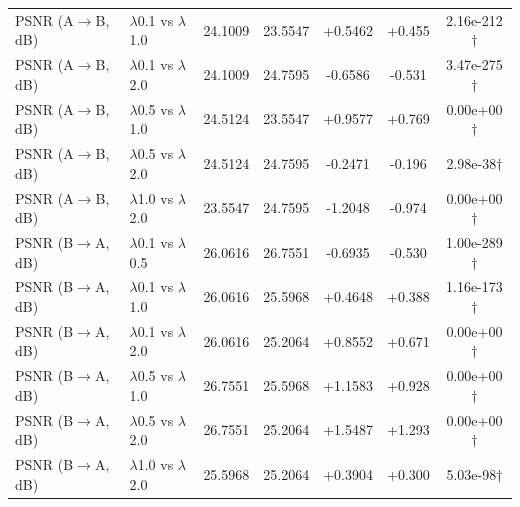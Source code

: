 \begin{table}[t]
\begin{tabular}{l l c c c c c}
PSNR (A$\to$B, dB) & $\lambda$0.1 vs $\lambda$1.0 & 24.1009 & 23.5547 & +0.5462 & +0.455 & 2.16e-212$\dagger$ \\
PSNR (A$\to$B, dB) & $\lambda$0.1 vs $\lambda$2.0 & 24.1009 & 24.7595 & -0.6586 & -0.531 & 3.47e-275$\dagger$ \\
PSNR (A$\to$B, dB) & $\lambda$0.5 vs $\lambda$1.0 & 24.5124 & 23.5547 & +0.9577 & +0.769 & 0.00e+00$\dagger$ \\
PSNR (A$\to$B, dB) & $\lambda$0.5 vs $\lambda$2.0 & 24.5124 & 24.7595 & -0.2471 & -0.196 & 2.98e-38$\dagger$ \\
PSNR (A$\to$B, dB) & $\lambda$1.0 vs $\lambda$2.0 & 23.5547 & 24.7595 & -1.2048 & -0.974 & 0.00e+00$\dagger$ \\
\midrule
PSNR (B$\to$A, dB) & $\lambda$0.1 vs $\lambda$0.5 & 26.0616 & 26.7551 & -0.6935 & -0.530 & 1.00e-289$\dagger$ \\
PSNR (B$\to$A, dB) & $\lambda$0.1 vs $\lambda$1.0 & 26.0616 & 25.5968 & +0.4648 & +0.388 & 1.16e-173$\dagger$ \\
PSNR (B$\to$A, dB) & $\lambda$0.1 vs $\lambda$2.0 & 26.0616 & 25.2064 & +0.8552 & +0.671 & 0.00e+00$\dagger$ \\
PSNR (B$\to$A, dB) & $\lambda$0.5 vs $\lambda$1.0 & 26.7551 & 25.5968 & +1.1583 & +0.928 & 0.00e+00$\dagger$ \\
PSNR (B$\to$A, dB) & $\lambda$0.5 vs $\lambda$2.0 & 26.7551 & 25.2064 & +1.5487 & +1.293 & 0.00e+00$\dagger$ \\
PSNR (B$\to$A, dB) & $\lambda$1.0 vs $\lambda$2.0 & 25.5968 & 25.2064 & +0.3904 & +0.300 & 5.03e-98$\dagger$ \\
\bottomrule
\end{tabular}
\end{table}
